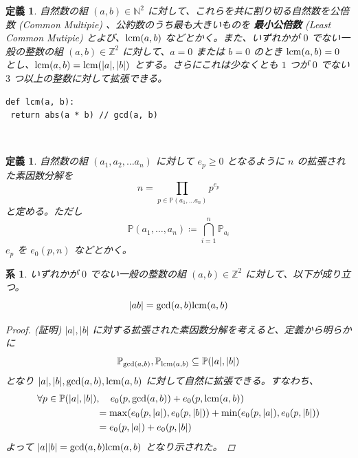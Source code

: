 \documentclass[12pt, a4j]{ltjsarticle}
\newtheorem{defi}[thm]{定義}
\newtheorem{cor}[thm]{系}
\newcommand*{\lcm}{{\rm lcm}}
\begin{document}
\vspace{1cm}

\begin{defi}
自然数の組 $(a,b)\in\mathbb{N}^2$ に対して、これらを共に割り切る自然数を公倍数 (Common Multipie) 、公約数のうち最も大きいものを {\bf 最小公倍数} (Least Common Mutipie) とよび、$\lcm(a,b)$ などとかく。また、いずれかが $0$ でない一般の整数の組 $(a,b)\in\mathbb{Z}^2$ に対して、$a=0$ または $b=0$ のとき $\lcm(a,b)=0$ とし、$\lcm(a,b)=\lcm(|a|,|b|)$ とする。さらにこれは少なくとも $1$ つが $0$ でない $3$ つ以上の整数に対して拡張できる。
\end{defi}

\vspace{1cm}

\begin{lstlisting}
def lcm(a, b):
 return abs(a * b) // gcd(a, b)
\end{lstlisting}
\quad\\
\begin{defi}
自然数の組 $(a_1,a_2,\ldots a_n)$ に対して $e_p\ge0$ となるように $n$ の拡張された素因数分解を
\begin{equation}
n = \prod_{p\in \mathbb{P}(a_1,\ldots a_n)} p^{e_p}
\end{equation}
と定める。ただし
\begin{equation}
\mathbb{P}(a_1,\ldots, a_n) \coloneqq \bigcap_{i=1}^n\mathbb{P}_{a_i}
\end{equation} $e_p$ を $e_0(p,n)$ などとかく。
\end{defi}

\vspace{1cm}

\begin{cor}
いずれかが $0$ でない一般の整数の組 $(a,b)\in\mathbb{Z}^2$ に対して、以下が成り立つ。
\begin{equation}
|ab| = \gcd(a,b)\lcm(a,b)
\end{equation}
\begin{proof}(証明)
$|a|,|b|$ に対する拡張された素因数分解を考えると、定義から明らかに
\begin{equation}
\mathbb{P}_{\gcd(a,b)}, \mathbb{P}_{\lcm(a,b)} \subseteq \mathbb{P}(|a|,|b|)
\end{equation}
となり $|a|,|b|,\gcd(a,b),\lcm(a,b)$ に対して自然に拡張できる。すなわち、
\begin{align}
\forall p \in\mathbb{P}(|a|,|b|)&,\quad e_0(p,\gcd(a,b)) + e_0(p,\lcm(a,b))  \\
&= \max(e_0(p,|a|),e_0(p,|b|)) + \min(e_0(p,|a|),e_0(p,|b|))  \\
&= e_0(p,|a|) + e_0(p,|b|)
\end{align}
よって $|a||b| = \gcd(a,b)\lcm(a,b)$ となり示された。
\end{proof}
\end{cor}
\end{document}
